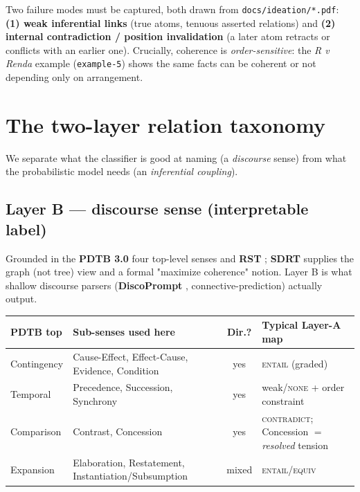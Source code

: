 \documentclass[11pt]{article}
\begin{document}
Two failure modes must be captured, both drawn from \texttt{docs/ideation/*.pdf}:
\textbf{(1) weak inferential links} (true atoms, tenuous asserted relations) and
\textbf{(2) internal contradiction / position invalidation} (a later atom retracts or
conflicts with an earlier one). Crucially, coherence is \emph{order-sensitive}: the
\emph{R v Renda} example (\texttt{example-5}) shows the same facts can be coherent or not
depending only on arrangement.

\section{The two-layer relation taxonomy}
\label{sec:taxonomy}

We separate what the classifier is good at naming (a \emph{discourse} sense) from what the
probabilistic model needs (an \emph{inferential coupling}).

\subsection{Layer B --- discourse sense (interpretable label)}
Grounded in the \textbf{PDTB 3.0} four top-level senses \citep{pdtb3,pdtb2} and
\textbf{RST} \citep{rst}; \textbf{SDRT} \citep{sdrt} supplies the graph (not tree) view and
a formal "maximize coherence" notion. Layer B is what shallow discourse parsers
(\textbf{DiscoPrompt} \citep{discoprompt}, connective-prediction) actually output.

\begin{center}\small
\begin{tabular}{@{}p{2.4cm}p{5.1cm}cp{4.4cm}@{}}
\toprule
\textbf{PDTB top} & \textbf{Sub-senses used here} & \textbf{Dir.?} & \textbf{Typical Layer-A map}\\
\midrule
Contingency & Cause-Effect, Effect-Cause, Evidence, Condition & yes & \textsc{entail} (graded)\\
Temporal    & Precedence, Succession, Synchrony & yes & weak/\textsc{none} + order constraint\\
Comparison  & Contrast, Concession & yes & \textsc{contradict}; Concession $=$ \emph{resolved} tension\\
Expansion   & Elaboration, Restatement, Instantiation/Subsumption & mixed & \textsc{entail}/\textsc{equiv}\\
\bottomrule
\end{tabular}
\end{center}
\end{document}
